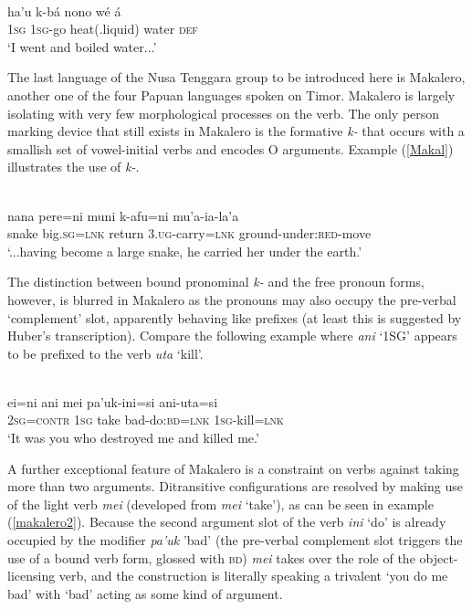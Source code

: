 \ea \label{tetun02}
\\
\gll ha'u k-bá nono wé á \\
\textsc{1}\textsc{sg} \textsc{1}\textsc{sg}-go heat(.liquid) water \textsc{def} \\
\glft `I went and boiled water...'
\z

The last language of the Nusa Tenggara group to be introduced here is Makalero, another one of the four Papuan languages spoken on Timor. Makalero is largely isolating with very few morphological processes on the verb. The only person marking device that still exists in Makalero is the formative \textit{k-} that occurs with a smallish set of vowel-initial verbs and encodes O arguments. Example (\ref{Makal}) illustrates the use of \textit{k-}.

\ea \label{Makal}
\\
\gll nana pere=ni muni k-afu=ni mu’a-ia-la’a \\
snake big.\textsc{sg}=\textsc{lnk} return \textsc{3}.\textsc{ug}-carry=\textsc{lnk} ground-under:\textsc{red}-move \\
\glft `...having become a large snake, he carried her under the earth.’ 
\z

The distinction between bound pronominal \textit{k-} and the free pronoun forms, however, is blurred in Makalero as the pronouns may also occupy the pre-verbal `complement' slot, apparently behaving like prefixes (at least this is suggested by Huber's transcription). Compare the following example where \textit{ani} `1SG' appears to be prefixed to the verb \textit{uta} `kill'.

\ea \label{makalero2}
\\
\gll ei=ni ani mei pa’uk-ini=si ani-uta=si \\
\textsc{2}\textsc{sg}=\textsc{contr} \textsc{1}\textsc{sg} take bad-do:\textsc{bd}=\textsc{lnk} \textsc{1}\textsc{sg}-kill=\textsc{lnk} \\
\glft `It was you who destroyed me and killed me.’ 
\z

A further exceptional feature of Makalero is a constraint on verbs against taking more than two arguments. Ditransitive configurations are resolved by making use of the light verb \textit{mei} (developed from \textit{mei} `take'), as can be seen in example (\ref{makalero2}). Because the second argument slot of the verb \textit{ini} `do' is already occupied by the modifier \textit{pa'uk} 'bad' (the pre-verbal complement slot triggers the use of a bound verb form, glossed with \textsc{bd}) \textit{mei} takes over the role of the object-licensing verb, and the construction is literally speaking a trivalent `you do me bad' with `bad' acting as some kind of argument.

